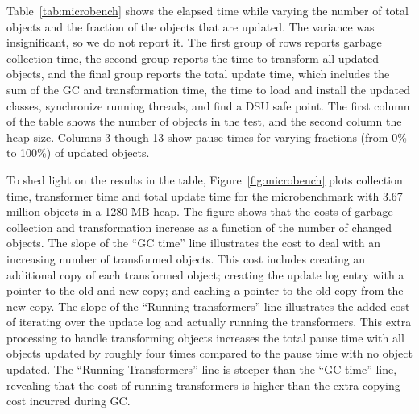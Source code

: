 \documentclass[9pt]{sigplanconf}
\begin{document}
Table~\ref{tab:microbench} shows the elapsed time
while varying the number of total objects and the fraction of the objects that are updated.  The
variance was insignificant, so we do not report it.   %
The first group of rows reports
garbage collection time, the second group reports the time to transform
all updated objects, and the final group reports the total update time, which
includes the sum of the GC and transformation time, the time to load and install the updated classes, synchronize
running threads, and find a DSU safe point. 
The first column of the table shows the number of objects in the test, and
the second column the heap size. Columns 3 though 13 show pause times for
varying fractions (from 0\% to 100\%) of updated objects. 

To shed light on the results in the table,
Figure~\ref{fig:microbench} plots collection time, transformer time and
total update time for the microbenchmark with 3.67 million objects in a
1280 MB heap.  The figure shows that the costs of garbage collection and
transformation increase  as a function of the number of changed objects.  The slope of the ``GC time'' line illustrates the cost to deal
with an increasing number of transformed objects.  This cost includes
creating an additional copy of each transformed object; creating the
update log entry with a pointer to the old and new copy; and caching a
pointer to the old copy from the new copy.  The slope of the
``Running transformers'' line illustrates the added cost of iterating
over the update log and actually running the transformers.  This extra
processing to handle transforming objects increases the total pause
time with all objects updated by roughly four times compared to the
pause time with no object updated.  The ``Running
Transformers'' line is steeper than the ``GC time'' line, revealing that
the cost of running transformers is higher than the extra copying cost
incurred during GC\@.
\end{document}
